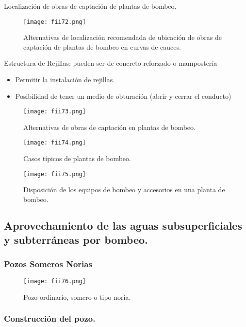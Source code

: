 Localización de obras de captación de plantas de bombeo.

\begin{figure}[h!]
	\centerline{\texttt{[image: fii72.png]}}
	\caption{Alternativas de localización recomendada de ubicación de obras de
		captación de plantas de bombeo en curvas de cauces.}
	\label{fii72}
\end{figure}


Estructura de Rejillas: pueden ser de concreto reforzado o mampostería
\begin{itemize}
	\item Permitir la instalación de rejillas.
	\item Posibilidad de tener un medio de obturación (abrir y cerrar el conducto)
\end{itemize}

\begin{figure}[h!]
	\centerline{\texttt{[image: fii73.png]}}
	\caption{Alternativas de obras de captación en plantas de bombeo.}
	\label{fii73}
\end{figure}

\begin{figure}[h!]
	\centerline{\texttt{[image: fii74.png]}}
	\caption{Casos típicos de plantas de bombeo.}
	\label{fii74}
\end{figure}

\begin{figure}[h!]
	\centerline{\texttt{[image: fii75.png]}}
	\caption{Disposición de los equipos de bombeo y accesorios en una planta de bombeo.}
	\label{fii75}
\end{figure}


\subsection{Aprovechamiento de las aguas subsuperficiales y subterráneas por bombeo.}

\subsubsection{Pozos Someros \textbf{Norias}}

\begin{figure}[h!]
	\centerline{\texttt{[image: fii76.png]}}
	\caption{Pozo ordinario, somero o tipo noria.}
	\label{fii76}
\end{figure}

\subsubsection{Construcción del pozo.}

